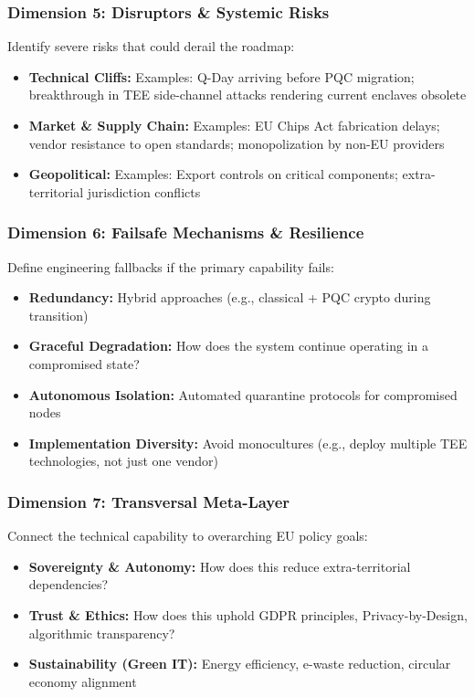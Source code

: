 \documentclass{ieeeaccess}
\begin{document}
\subsubsection*{Dimension 5: Disruptors \& Systemic Risks}
Identify severe risks that could derail the roadmap:
\begin{itemize}
    \item \textbf{Technical Cliffs:} Examples: Q-Day arriving before PQC migration; breakthrough in TEE side-channel attacks rendering current enclaves obsolete
    \item \textbf{Market \& Supply Chain:} Examples: EU Chips Act fabrication delays; vendor resistance to open standards; monopolization by non-EU providers
    \item \textbf{Geopolitical:} Examples: Export controls on critical components; extra-territorial jurisdiction conflicts
\end{itemize}

\subsubsection*{Dimension 6: Failsafe Mechanisms \& Resilience}
Define engineering fallbacks if the primary capability fails:
\begin{itemize}
    \item \textbf{Redundancy:} Hybrid approaches (e.g., classical + PQC crypto during transition)
    \item \textbf{Graceful Degradation:} How does the system continue operating in a compromised state?
    \item \textbf{Autonomous Isolation:} Automated quarantine protocols for compromised nodes
    \item \textbf{Implementation Diversity:} Avoid monocultures (e.g., deploy multiple TEE technologies, not just one vendor)
\end{itemize}

\subsubsection*{Dimension 7: Transversal Meta-Layer}
Connect the technical capability to overarching EU policy goals:
\begin{itemize}
    \item \textbf{Sovereignty \& Autonomy:} How does this reduce extra-territorial dependencies?
    \item \textbf{Trust \& Ethics:} How does this uphold GDPR principles, Privacy-by-Design, algorithmic transparency?
    \item \textbf{Sustainability (Green IT):} Energy efficiency, e-waste reduction, circular economy alignment
\end{itemize}
\end{document}
